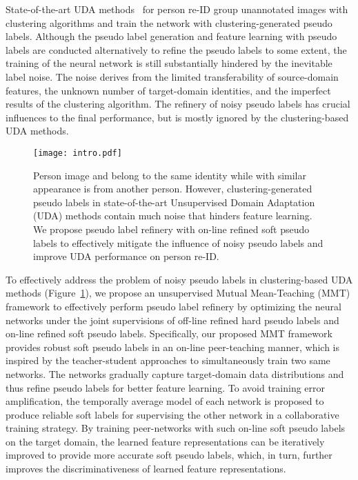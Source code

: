 \documentclass{article} \usepackage{iclr2020_conference,times}
\begin{document}
State-of-the-art UDA methods~\citep{song2018unsupervised,zhang2019self,yang2019selfsimilarity} for person re-ID group unannotated images with clustering algorithms and train the network with clustering-generated pseudo labels.
Although the pseudo label generation and feature learning with pseudo labels are conducted alternatively to refine the pseudo labels to some extent,
the training of the neural network is still substantially hindered by the inevitable label noise. 
The noise derives from the limited transferability of source-domain features, the unknown number of target-domain identities, and the imperfect results of the clustering algorithm.
The refinery of noisy pseudo labels has crucial influences to the final performance, but is mostly ignored by the clustering-based UDA methods.




\begin{figure}[tb]
\begin{center}
       \texttt{[image: intro.pdf]}
\end{center}
\vspace{-10pt}
   \caption{
   Person image  and  belong to the same identity while  with similar appearance is from another person. 
   However, clustering-generated pseudo labels in state-of-the-art Unsupervised Domain Adaptation (UDA) methods contain much noise that hinders feature learning.
   We propose pseudo label refinery with on-line refined soft pseudo labels to effectively mitigate the influence of noisy pseudo labels and improve UDA performance on person re-ID.}
\label{fig:intro}
\end{figure}

To effectively address the problem of noisy pseudo labels in clustering-based UDA methods \citep{song2018unsupervised,zhang2019self,yang2019selfsimilarity} (Figure~\ref{fig:intro}),
we propose an unsupervised Mutual Mean-Teaching (MMT) framework to effectively perform pseudo label refinery by optimizing the neural networks under the joint supervisions of off-line refined hard pseudo labels and on-line refined soft pseudo labels.
Specifically, our proposed MMT framework provides robust soft pseudo labels in an on-line peer-teaching manner, which is inspired by the {teacher-student} approaches \citep{tarvainen2017mean,zhang2018deep} to simultaneously train two same networks. The networks gradually capture target-domain data distributions and thus refine pseudo labels for better feature learning. To avoid training error amplification, the temporally average model of each network is proposed to produce reliable soft labels for supervising the other network in a collaborative training strategy.
By training peer-networks with such on-line soft pseudo labels on the target domain, the learned feature representations can be iteratively improved to provide more accurate soft pseudo labels, which, in turn, further improves the discriminativeness of learned feature representations.
\end{document}

